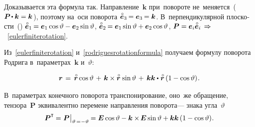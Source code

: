 \begin{otherlanguage}{russian}
\vspace{-0.1em}
Доказывается эта формула так. Направление~${\bm{k}}$ при~повороте не~меняется~(${\bm{P} \hspace{-0.2ex}\dotp \bm{k} = \bm{k}\hspace{.12ex}}$), поэтому на~оси поворота ${\mathcircabove{\bm{e}}_3 \hspace{-0.16ex} = \bm{e}_3 \hspace{-0.16ex} = \bm{k}}$. В~перпендикулярной плоскости~() ${\mathcircabove{\bm{e}}_1 \hspace{-0.16ex} = \bm{e}_1 \operatorname{cos} \vartheta - \bm{e}_2 \operatorname{sin} \vartheta}$, ${\mathcircabove{\bm{e}}_2 \hspace{-0.16ex} = \bm{e}_1 \operatorname{sin} \vartheta + \bm{e}_2 \operatorname{cos} \vartheta}$, ${\bm{P} = \bm{e}_i \mathcircabove{\bm{e}}_i \,\Rightarrow\hspace{.2ex}}$~\eqref{eulerfiniterotation}.



Из~\eqref{eulerfiniterotation} и~\eqref{rodriguesrotationformula} получаем формулу поворота Родрига в~параметрах~$\bm{k}$ и~$\vartheta$:

\nopagebreak\vspace{-0.3em}\begin{equation*}
\locationvector \hspace{.3ex}
= \hspace{.4ex} \initiallocationvector \operatorname{cos} \vartheta \hspace{.3ex}+\hspace{.3ex} \bm{k} \times \initiallocationvector \hspace{.2ex} \operatorname{sin} \vartheta \hspace{.3ex}+\hspace{.4ex} \bm{k} \bm{k} \dotp \hspace{.1ex} \initiallocationvector \left({1 - \operatorname{cos} \vartheta}\right) \hspace{-0.25ex}.
\end{equation*}

\vspace{-0.16em}
В~параметрах конечного поворота транспонирование, оно~же обращение, тензора~$\bm{P}$ эквивалентно перемене направления поворота\:--- знака угла~$\vartheta$
\[
\bm{P}^{\T} \hspace{-0.1ex}=\hspace{.1ex} \bm{P} \hspace{.1ex} \bigr|_{\vartheta \,=\hspace{.1ex} -\vartheta} \hspace{-0.1ex} = \UnitDyad \operatorname{cos} \vartheta - \bm{k} \times\hspace{-0.2ex} \UnitDyad \operatorname{sin} \vartheta + \bm{k} \bm{k} \left({1 - \operatorname{cos} \vartheta}\right) \hspace{-0.32ex}.
\]


\end{otherlanguage}
